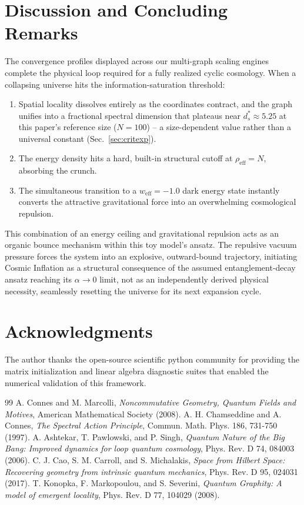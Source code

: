 \documentclass[onecolumn,PRD,amsmath,amssymb,aps,nofootinbib,superscriptaddress,11pt]{revtex4-2}
\begin{document}
\section{Discussion and Concluding Remarks}
The convergence profiles displayed across our multi-graph scaling engines complete the physical loop required for a fully realized cyclic cosmology. When a collapsing universe hits the information-saturation threshold:
\begin{enumerate}
\item Spatial locality dissolves entirely as the coordinates contract, and the graph unifies into a fractional spectral dimension that plateaus near $d_s^* \approx 5.25$ at this paper's reference size ($N=100$) -- a size-dependent value rather than a universal constant (Sec.~\ref{sec:critexp}).
\item The energy density hits a hard, built-in structural cutoff at $\rho_{\text{eff}} = N$, absorbing the crunch.
\item The simultaneous transition to a $w_{\text{eff}} = -1.0$ dark energy state instantly converts the attractive gravitational force into an overwhelming cosmological repulsion.
\end{enumerate}
This combination of an energy ceiling and gravitational repulsion acts as an organic bounce mechanism within this toy model's ansatz. The repulsive vacuum pressure forces the system into an explosive, outward-bound trajectory, initiating Cosmic Inflation as a structural consequence of the assumed entanglement-decay ansatz reaching its $\alpha \to 0$ limit, not as an independently derived physical necessity, seamlessly resetting the universe for its next expansion cycle.

\section*{Acknowledgments}
The author thanks the open-source scientific python community for providing the matrix initialization and linear algebra diagnostic suites that enabled the numerical validation of this framework.

\begin{thebibliography}{99}
A. Connes and M. Marcolli, \textit{Noncommutative Geometry, Quantum Fields and Motives}, American Mathematical Society (2008).
A. H. Chamseddine and A. Connes, \textit{The Spectral Action Principle}, Commun. Math. Phys. 186, 731-750 (1997).
A. Ashtekar, T. Pawlowski, and P. Singh, \textit{Quantum Nature of the Big Bang: Improved dynamics for loop quantum cosmology}, Phys. Rev. D 74, 084003 (2006).
C. J. Cao, S. M. Carroll, and S. Michalakis, \textit{Space from Hilbert Space: Recovering geometry from intrinsic quantum mechanics}, Phys. Rev. D 95, 024031 (2017).
T. Konopka, F. Markopoulou, and S. Severini, \textit{Quantum Graphity: A model of emergent locality}, Phys. Rev. D 77, 104029 (2008).
\end{thebibliography}
\end{document}
